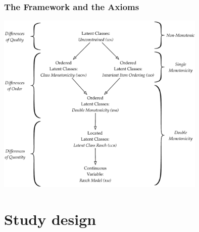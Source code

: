 \documentclass[10pt,serif,professionalfont]{beamer}
\begin{document}
\begin{frame}

    \frametitle{The Framework and the Axioms}

        \centering \includegraphics[width=0.75\textwidth]{./figs/Structure3.pdf} \\

\end{frame}


\section{Study design}
\end{document}
